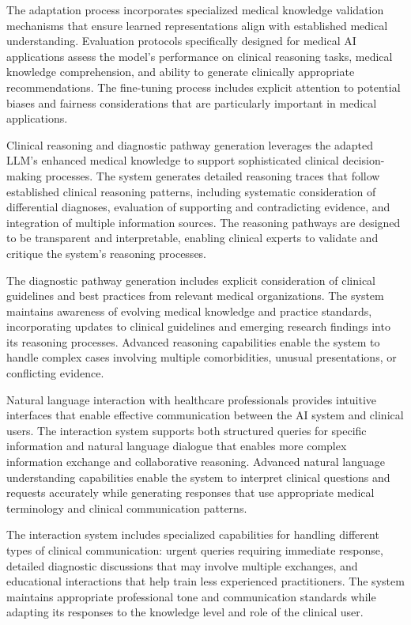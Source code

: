 The adaptation process incorporates specialized medical knowledge validation mechanisms that ensure learned representations align with established medical understanding. Evaluation protocols specifically designed for medical AI applications assess the model's performance on clinical reasoning tasks, medical knowledge comprehension, and ability to generate clinically appropriate recommendations. The fine-tuning process includes explicit attention to potential biases and fairness considerations that are particularly important in medical applications.

Clinical reasoning and diagnostic pathway generation leverages the adapted LLM's enhanced medical knowledge to support sophisticated clinical decision-making processes. The system generates detailed reasoning traces that follow established clinical reasoning patterns, including systematic consideration of differential diagnoses, evaluation of supporting and contradicting evidence, and integration of multiple information sources. The reasoning pathways are designed to be transparent and interpretable, enabling clinical experts to validate and critique the system's reasoning processes.

The diagnostic pathway generation includes explicit consideration of clinical guidelines and best practices from relevant medical organizations. The system maintains awareness of evolving medical knowledge and practice standards, incorporating updates to clinical guidelines and emerging research findings into its reasoning processes. Advanced reasoning capabilities enable the system to handle complex cases involving multiple comorbidities, unusual presentations, or conflicting evidence.

Natural language interaction with healthcare professionals provides intuitive interfaces that enable effective communication between the AI system and clinical users. The interaction system supports both structured queries for specific information and natural language dialogue that enables more complex information exchange and collaborative reasoning. Advanced natural language understanding capabilities enable the system to interpret clinical questions and requests accurately while generating responses that use appropriate medical terminology and clinical communication patterns.

The interaction system includes specialized capabilities for handling different types of clinical communication: urgent queries requiring immediate response, detailed diagnostic discussions that may involve multiple exchanges, and educational interactions that help train less experienced practitioners. The system maintains appropriate professional tone and communication standards while adapting its responses to the knowledge level and role of the clinical user.

